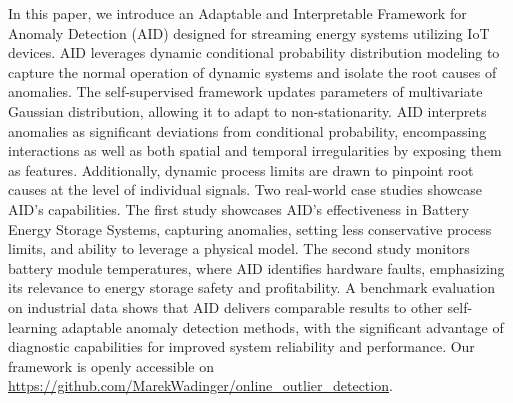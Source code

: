 In this paper, we introduce an Adaptable and Interpretable Framework for Anomaly Detection (AID) designed for streaming energy systems utilizing IoT devices. AID leverages dynamic conditional probability distribution modeling to capture the normal operation of dynamic systems and isolate the root causes of anomalies. The self-supervised framework updates parameters of multivariate Gaussian distribution, allowing it to adapt to non-stationarity. AID interprets anomalies as significant deviations from conditional probability, encompassing interactions as well as both spatial and temporal irregularities by exposing them as features. Additionally, dynamic process limits are drawn to pinpoint root causes at the level of individual signals. Two real-world case studies showcase AID's capabilities. The first study showcases AID's effectiveness in Battery Energy Storage Systems, capturing anomalies, setting less conservative process limits, and ability to leverage a physical model. The second study monitors battery module temperatures, where AID identifies hardware faults, emphasizing its relevance to energy storage safety and profitability. A benchmark evaluation on industrial data shows that AID delivers comparable results to other self-learning adaptable anomaly detection methods, with the significant advantage of diagnostic capabilities for improved system reliability and performance. Our framework is openly accessible on \url{https://github.com/MarekWadinger/online_outlier_detection}.%
